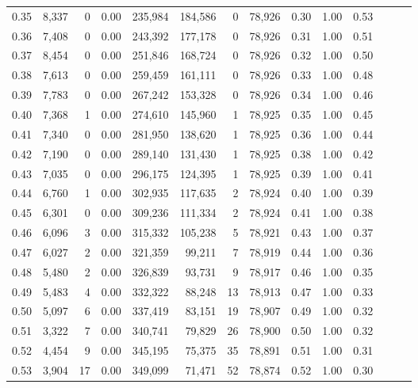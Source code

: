 \begin{tabular}{rrrrrrrrrrrrrr}
0.35 &  8,337 &      0 &  0.00 &  235,984 &  184,586 &       0 &  78,926 &  0.30 &  1.00 &      0.53 \\
0.36 &  7,408 &      0 &  0.00 &  243,392 &  177,178 &       0 &  78,926 &  0.31 &  1.00 &      0.51 \\
0.37 &  8,454 &      0 &  0.00 &  251,846 &  168,724 &       0 &  78,926 &  0.32 &  1.00 &      0.50 \\
0.38 &  7,613 &      0 &  0.00 &  259,459 &  161,111 &       0 &  78,926 &  0.33 &  1.00 &      0.48 \\
0.39 &  7,783 &      0 &  0.00 &  267,242 &  153,328 &       0 &  78,926 &  0.34 &  1.00 &      0.46 \\
0.40 &  7,368 &      1 &  0.00 &  274,610 &  145,960 &       1 &  78,925 &  0.35 &  1.00 &      0.45 \\
0.41 &  7,340 &      0 &  0.00 &  281,950 &  138,620 &       1 &  78,925 &  0.36 &  1.00 &      0.44 \\
0.42 &  7,190 &      0 &  0.00 &  289,140 &  131,430 &       1 &  78,925 &  0.38 &  1.00 &      0.42 \\
0.43 &  7,035 &      0 &  0.00 &  296,175 &  124,395 &       1 &  78,925 &  0.39 &  1.00 &      0.41 \\
0.44 &  6,760 &      1 &  0.00 &  302,935 &  117,635 &       2 &  78,924 &  0.40 &  1.00 &      0.39 \\
0.45 &  6,301 &      0 &  0.00 &  309,236 &  111,334 &       2 &  78,924 &  0.41 &  1.00 &      0.38 \\
0.46 &  6,096 &      3 &  0.00 &  315,332 &  105,238 &       5 &  78,921 &  0.43 &  1.00 &      0.37 \\
0.47 &  6,027 &      2 &  0.00 &  321,359 &   99,211 &       7 &  78,919 &  0.44 &  1.00 &      0.36 \\
0.48 &  5,480 &      2 &  0.00 &  326,839 &   93,731 &       9 &  78,917 &  0.46 &  1.00 &      0.35 \\
0.49 &  5,483 &      4 &  0.00 &  332,322 &   88,248 &      13 &  78,913 &  0.47 &  1.00 &      0.33 \\
0.50 &  5,097 &      6 &  0.00 &  337,419 &   83,151 &      19 &  78,907 &  0.49 &  1.00 &      0.32 \\
0.51 &  3,322 &      7 &  0.00 &  340,741 &   79,829 &      26 &  78,900 &  0.50 &  1.00 &      0.32 \\
0.52 &  4,454 &      9 &  0.00 &  345,195 &   75,375 &      35 &  78,891 &  0.51 &  1.00 &      0.31 \\
0.53 &  3,904 &     17 &  0.00 &  349,099 &   71,471 &      52 &  78,874 &  0.52 &  1.00 &      0.30 \\

\end{tabular}

